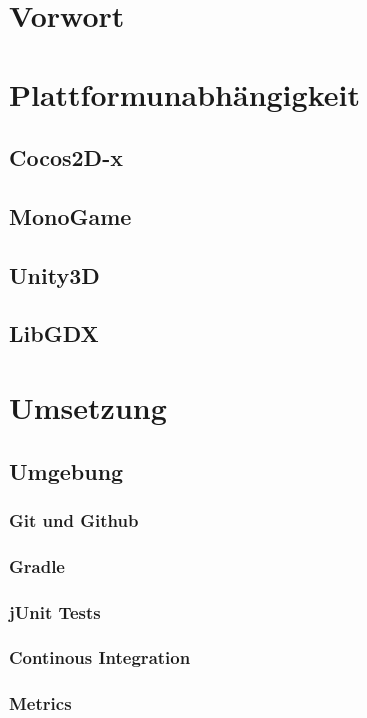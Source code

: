 \section{Vorwort}									
\section{Plattformunabhängigkeit}					
	\subsection{Cocos2D-x}							
	\subsection{MonoGame}							
	\subsection{Unity3D}							
	\subsection{LibGDX}								
\section{Umsetzung}
	\subsection{Umgebung}
		\subsubsection{Git und Github}				
		\subsubsection{Gradle}						
		\subsubsection{jUnit Tests}					
		\subsubsection{Continous Integration}		
		\subsubsection{Metrics}						             %
